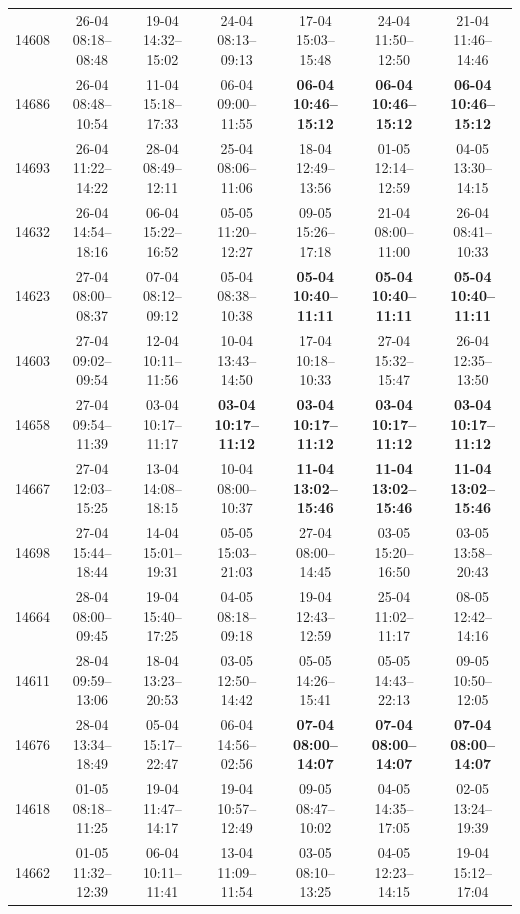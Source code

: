 \begin{table}[htbp]
\begin{tabular}{|r|c|c|c|c|c|c|}
14608 & 26-04 08:18--08:48 & 19-04 14:32--15:02 & 24-04 08:13--09:13 & 17-04 15:03--15:48 & 24-04 11:50--12:50 & 21-04 11:46--14:46 \\ 
14686 & 26-04 08:48--10:54 & 11-04 15:18--17:33 & 06-04 09:00--11:55 & \textbf{06-04 10:46--15:12} & \textbf{06-04 10:46--15:12} & \textbf{06-04 10:46--15:12} \\ 
14693 & 26-04 11:22--14:22 & 28-04 08:49--12:11 & 25-04 08:06--11:06 & 18-04 12:49--13:56 & 01-05 12:14--12:59 & 04-05 13:30--14:15 \\ 
14632 & 26-04 14:54--18:16 & 06-04 15:22--16:52 & 05-05 11:20--12:27 & 09-05 15:26--17:18 & 21-04 08:00--11:00 & 26-04 08:41--10:33 \\ 
14623 & 27-04 08:00--08:37 & 07-04 08:12--09:12 & 05-04 08:38--10:38 & \textbf{05-04 10:40--11:11} & \textbf{05-04 10:40--11:11} & \textbf{05-04 10:40--11:11} \\ 
14603 & 27-04 09:02--09:54 & 12-04 10:11--11:56 & 10-04 13:43--14:50 & 17-04 10:18--10:33 & 27-04 15:32--15:47 & 26-04 12:35--13:50 \\ 
14658 & 27-04 09:54--11:39 & 03-04 10:17--11:17 & \textbf{03-04 10:17--11:12} & \textbf{03-04 10:17--11:12} & \textbf{03-04 10:17--11:12} & \textbf{03-04 10:17--11:12} \\ 
14667 & 27-04 12:03--15:25 & 13-04 14:08--18:15 & 10-04 08:00--10:37 & \textbf{11-04 13:02--15:46} & \textbf{11-04 13:02--15:46} & \textbf{11-04 13:02--15:46} \\ 
14698 & 27-04 15:44--18:44 & 14-04 15:01--19:31 & 05-05 15:03--21:03 & 27-04 08:00--14:45 & 03-05 15:20--16:50 & 03-05 13:58--20:43 \\ 
14664 & 28-04 08:00--09:45 & 19-04 15:40--17:25 & 04-05 08:18--09:18 & 19-04 12:43--12:59 & 25-04 11:02--11:17 & 08-05 12:42--14:16 \\ 
14611 & 28-04 09:59--13:06 & 18-04 13:23--20:53 & 03-05 12:50--14:42 & 05-05 14:26--15:41 & 05-05 14:43--22:13 & 09-05 10:50--12:05 \\ 
14676 & 28-04 13:34--18:49 & 05-04 15:17--22:47 & 06-04 14:56--02:56 & \textbf{07-04 08:00--14:07} & \textbf{07-04 08:00--14:07} & \textbf{07-04 08:00--14:07} \\ 
14618 & 01-05 08:18--11:25 & 19-04 11:47--14:17 & 19-04 10:57--12:49 & 09-05 08:47--10:02 & 04-05 14:35--17:05 & 02-05 13:24--19:39 \\ 
14662 & 01-05 11:32--12:39 & 06-04 10:11--11:41 & 13-04 11:09--11:54 & 03-05 08:10--13:25 & 04-05 12:23--14:15 & 19-04 15:12--17:04 \\ 

\end{tabular}
\end{table}
